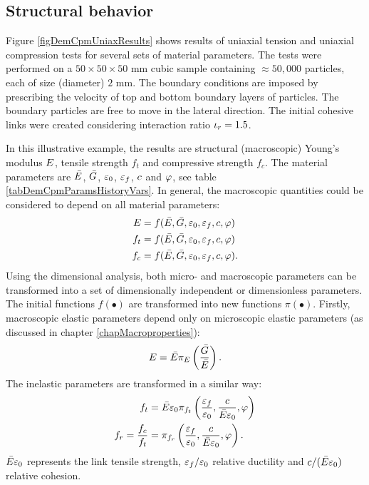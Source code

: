 \subsection{Structural behavior}\label{secDemCpmStructBehavior}
Figure \ref{figDemCpmUniaxResults} shows results of uniaxial tension and uniaxial compression tests for several sets of material parameters.
The tests were performed on a $50\times50\times50$ mm cubic sample containing $\approx 50{,}000$ particles, each of size (diameter) $2$ mm.
The boundary conditions are imposed by prescribing the velocity of top and bottom boundary layers of particles.
The boundary particles are free to move in the lateral direction.
The initial cohesive links were created considering interaction ratio $\iota_r=1{.}5$.

In this illustrative example, the results are structural (macroscopic) Young's modulus $E$, tensile strength $f_t$ and compressive strength $f_c$.
The material parameters are $\linkMaterialStiffnessNormal$, $\linkMaterialStiffnessShear$, $\varepsilon_0$, $\varepsilon_f$, $c$ and $\varphi$, see table \ref{tabDemCpmParamsHistoryVars}. In general, the macroscopic quantities could be considered to depend on all material parameters:
\begin{align}
	\youngModulus &= f(\linkMaterialStiffnessNormal,\linkMaterialStiffnessShear,\strainO,\strainF,\cohesion,\frictionAngle)
	\\
	f_t           &= f(\linkMaterialStiffnessNormal,\linkMaterialStiffnessShear,\strainO,\strainF,\cohesion,\frictionAngle)
	\\
	f_c           &= f(\linkMaterialStiffnessNormal,\linkMaterialStiffnessShear,\strainO,\strainF,\cohesion,\frictionAngle)
.
\end{align}
Using the dimensional analysis, both micro- and macroscopic parameters can be transformed into a set of dimensionally independent or dimensionless parameters.
The initial functions $f(\bullet)$ are transformed into new functions $\pi(\bullet)$.
Firstly, macroscopic elastic parameters depend only on microscopic elastic parameters (as discussed in chapter \ref{chapMacroproperties}):
\begin{equation}
	\youngModulus = \linkMaterialStiffnessNormal \pi_\youngModulus\br{\frac{\linkMaterialStiffnessShear}{\linkMaterialStiffnessNormal}}
	.
\end{equation}
The inelastic parameters are transformed in a similar way:
\begin{align}
	f_t &= \linkMaterialStiffnessNormal\strainO\pi_{f_t}\br{\frac{\strainF}{\strainO},\frac{\cohesion}{\linkMaterialStiffnessNormal\strainO},\frictionAngle}
	\\
	f_r = \frac{f_c}{f_t} &= \pi_{f_r}\br{\frac{\strainF}{\strainO},\frac{\cohesion}{\linkMaterialStiffnessNormal\strainO},\frictionAngle}
	.
\end{align}
$\linkMaterialStiffnessNormal\strainO$ represents the link tensile strength, $\varepsilon_f/\varepsilon_0$ relative ductility and $\cohesion/(\linkMaterialStiffnessNormal\strainO)$ relative cohesion.


